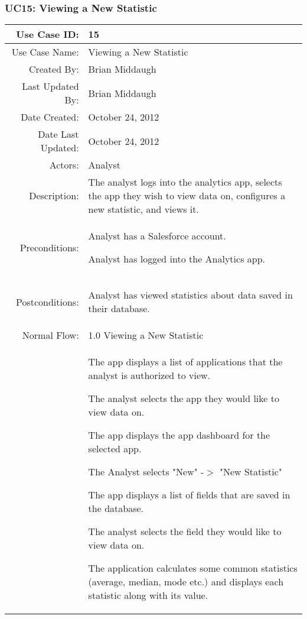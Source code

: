 \documentclass[12pt,oneside,letterpaper]{article}
\newenvironment{packed_enumerate}{ %
\vspace{-7mm}
\begin{enumerate}
  \setlength{\itemsep}{0pt}
  \setlength{\parskip}{0pt}
  \setlength{\parsep}{0pt}
}{\end{enumerate}
\vspace{-8mm}}
\begin{document}
\subsubsection{\label{Viewing a New Statistic}UC15: Viewing a New Statistic}
\begin{longtable}{|r|p{3.8in}|}
\hline
Use Case ID:&15\\
\hline
Use Case Name:&Viewing a New Statistic\\
\hline
Created By:&Brian Middaugh\\
\hline
Last Updated By:&Brian Middaugh\\
\hline
Date Created:&October 24, 2012\\
\hline
Date Last Updated:&October 24, 2012\\
\hline
Actors:&Analyst\\
\hline
Description:& The analyst logs into the analytics app, selects the app they wish to view data on, configures a new statistic, and views it.\\
\hline
Preconditions:&
\begin{packed_enumerate}
\item Analyst has a Salesforce account.
\item Analyst has logged into the Analytics app.
\end{packed_enumerate}\\
\hline
Postconditions:&
\begin{packed_enumerate}
\item Analyst has viewed statistics about data saved in their database.
\end{packed_enumerate}\\
\hline
Normal Flow:&1.0 Viewing a New Statistic\\
&  %
\begin{packed_enumerate}
\item The app displays a list of applications that the analyst is authorized to view.
\item The analyst selects the app they would like to view data on.
\item The app displays the app dashboard for the selected app.
\item The Analyst selects "New" -$>$ "New Statistic"
\item The app displays a list of fields that are saved in the database.
\item The analyst selects the field they would like to view data on.
\item The application calculates some common statistics (average, median, mode etc.) and displays each statistic along with its value.

\end{packed_enumerate}
\end{longtable}
\end{document}
